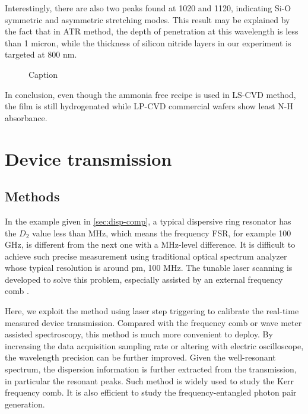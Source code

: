 Interestingly, there are also two peaks found at 1020 and 1120, indicating Si-O symmetric and asymmetric stretching modes. This result may be explained by the fact that in ATR method, the depth of penetration at this wavelength is less than 1 micron, while the thickness of silicon nitride layers in our experiment is targeted at 800 nm.


\begin{figure}
	\centering
	
	\caption{Caption}
	\label{fig:ftir}
\end{figure}

In conclusion, even though the ammonia free recipe is used in LS-CVD method, the film is still hydrogenated while LP-CVD commercial wafers show least N-H absorbance.



\begin{figure}
	\centering
	
	\label{fig:ellipso}
\end{figure}

\section{Device transmission}

\subsection{Methods}

In the example given in \autoref{sec:disp-comp},  a typical dispersive ring resonator has the $ D_2 $ value less than MHz, which means the frequency FSR, for example 100 GHz, is different from the next one with a MHz-level difference. It is difficult to achieve such precise measurement using traditional optical spectrum analyzer whose typical resolution is around pm, 100 MHz. The tunable laser scanning is developed to solve this problem, especially assisted by an external frequency comb \cite{Liu2016d}. 

Here, we exploit the method using laser step triggering to calibrate the real-time measured device transmission. Compared with the frequency comb or wave meter assisted spectroscopy, this method is much more convenient to deploy. By increasing the data acquisition sampling rate or altering with electric oscilloscope, the wavelength precision can be further improved.
Given the well-resonant spectrum, the dispersion information is further extracted from the transmission, in particular the resonant peaks. Such method is widely used to study the Kerr frequency comb. It is also efficient to study the frequency-entangled photon pair generation.

